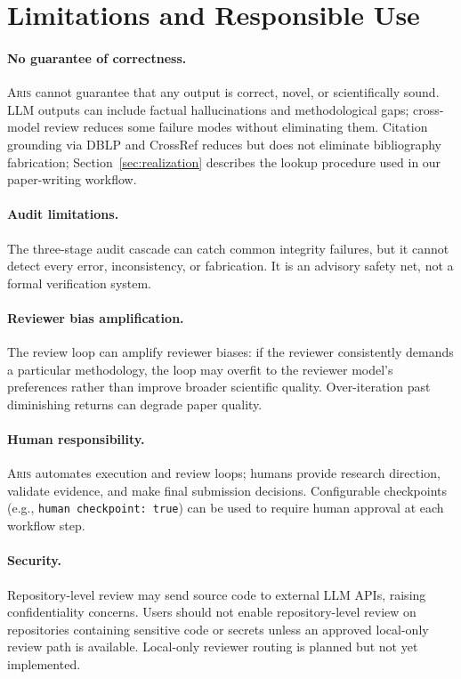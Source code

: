 \documentclass{article}
\newcommand{\aris}{\textsc{Aris}}
\theoremstyle{remark}
\begin{document}
 \section{Limitations and Responsible Use}
\label{sec:limitations}

\paragraph{No guarantee of correctness.}
\aris{} cannot guarantee that any output is correct, novel, or scientifically sound.
LLM outputs can include factual hallucinations and methodological gaps; cross-model review reduces some failure modes without eliminating them.
Citation grounding via DBLP and CrossRef reduces but does not eliminate bibliography fabrication; Section~\ref{sec:realization} describes the lookup procedure used in our paper-writing workflow.

\paragraph{Audit limitations.}
The three-stage audit cascade can catch common integrity failures, but it cannot detect every error, inconsistency, or fabrication.
It is an advisory safety net, not a formal verification system.

\paragraph{Reviewer bias amplification.}
The review loop can amplify reviewer biases: if the reviewer consistently demands a particular methodology, the loop may overfit to the reviewer model's preferences rather than improve broader scientific quality.
Over-iteration past diminishing returns can degrade paper quality.

\paragraph{Human responsibility.}
\aris{} automates execution and review loops; humans provide research direction, validate evidence, and make final submission decisions.
Configurable checkpoints (e.g., \texttt{human checkpoint: true}) can be used to require human approval at each workflow step.

\paragraph{Security.}
Repository-level review may send source code to external LLM APIs, raising confidentiality concerns.
Users should not enable repository-level review on repositories containing sensitive code or secrets unless an approved local-only review path is available.
Local-only reviewer routing is planned but not yet implemented.
\end{document}
